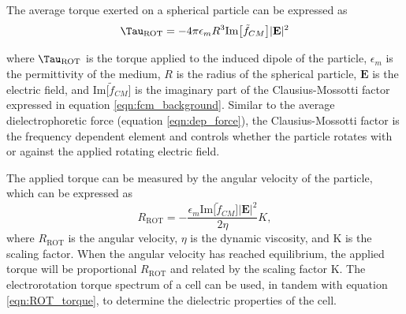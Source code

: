  \par The average torque exerted on a spherical particle can be expressed as \cite{morgan_single_2007}
 \begin{equation}
    \Tau_{\text{ROT}} = -4\pi \epsilon_m R^3 \text{Im}\big[\tilde{f}_{CM}\big]|\textbf{E}|^2
    \label{eqn:ROT_torque}
 \end{equation}
 
 \noindent where $\Tau_{\text{ROT}}$ is the torque applied to the induced dipole of the particle, $\epsilon_m$ is the permittivity of the medium, $R$ is the radius of the spherical particle, $\textbf{E}$ is the electric field, and $\text{Im}\big[\tilde{f}_{CM}\big]$ is the imaginary part of the Clausius-Mossotti factor expressed in equation \ref{eqn:fcm_background}. Similar to the average dielectrophoretic force (equation \ref{eqn:dep_force}), the Clausius-Mossotti factor is the frequency dependent element and controls whether the particle rotates with or against the applied rotating electric field.
 
 \par The applied torque can be measured by the angular velocity of the particle, which can be expressed as \cite{morgan_ac_2003}
 \begin{equation}
     R_{\text{ROT}} = - \frac{\epsilon_m\text{Im}\big[\tilde{f}_{CM}\big]|\textbf{E}|^2}{2\eta}K, 
 \end{equation}
 \noindent where $R_{\text{ROT}}$ is the angular velocity, $\eta$ is the dynamic viscosity, and K is the scaling factor. When the angular velocity has reached equilibrium, the applied torque will be proportional $R_{\text{ROT}}$ and related by the scaling factor K. The electrorotation torque spectrum of a cell can be used, in tandem with equation \ref{eqn:ROT_torque}, to determine the dielectric properties of the cell. 
 
